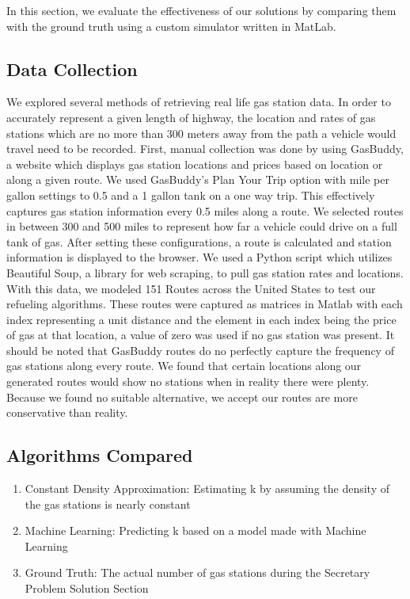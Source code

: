 In this section, we evaluate the effectiveness of our solutions by comparing them with the ground truth using a custom simulator written in MatLab.

\subsection{Data Collection}
We explored several methods of retrieving real life gas station data. In order to accurately represent a given length of highway, the location and rates of gas stations which are no more than 300 meters away from the path a vehicle would travel need to be recorded. First, manual collection was done by using GasBuddy, a website which displays gas station locations and prices based on location or along a given route. We used GasBuddy’s Plan Your Trip option with mile per gallon settings to 0.5 and a 1 gallon tank on a one way trip. This effectively captures gas station information every 0.5 miles along a route. We selected routes in between 300 and 500 miles to represent how far a vehicle could drive on a full tank of gas. After setting these configurations, a route is calculated and station information is displayed to the browser. We used a Python script which utilizes Beautiful Soup, a library for web scraping, to pull gas station rates and locations. With this data, we modeled 151 Routes across the United States to test our refueling algorithms. These routes were captured as matrices in Matlab with each index representing a unit distance and the element in each index being the price of gas at that location, a value of zero was used if no gas station was present. It should be noted that GasBuddy routes do no perfectly capture the frequency of gas stations along every route. We found that certain locations along our generated routes would show no stations when in reality there were plenty. Because we found no suitable alternative, we accept our routes are more conservative than reality.

\subsection{Algorithms Compared}
\begin{enumerate}
\item Constant Density Approximation: Estimating k by assuming the density of the gas stations is nearly constant
\item Machine Learning: Predicting k based on a model made with Machine Learning
\item Ground Truth: The actual number of gas stations during the Secretary Problem Solution Section
\end{enumerate}


